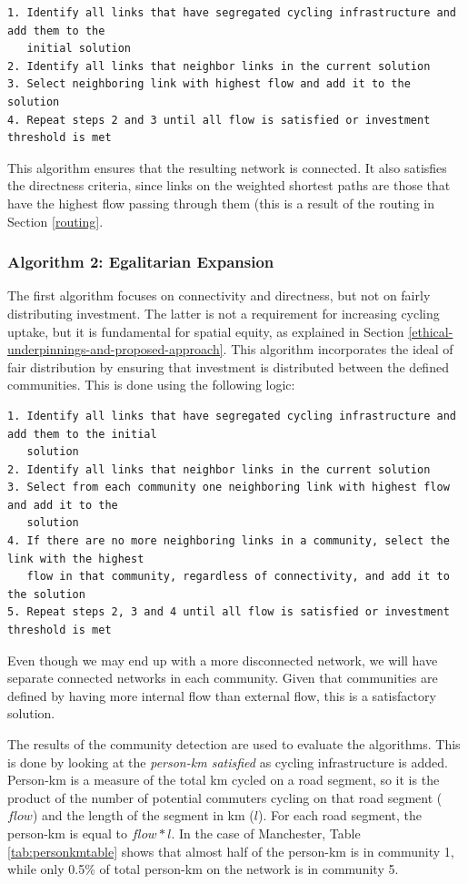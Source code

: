 \documentclass[
]{article}
\begin{document}
\begin{verbatim}
1. Identify all links that have segregated cycling infrastructure and add them to the 
   initial solution
2. Identify all links that neighbor links in the current solution
3. Select neighboring link with highest flow and add it to the solution
4. Repeat steps 2 and 3 until all flow is satisfied or investment threshold is met
\end{verbatim}

This algorithm ensures that the resulting network is connected.
It also satisfies the directness criteria, since links on the weighted shortest paths are those that have the highest flow passing through them (this is a result of the routing in Section \ref{routing}.

\hypertarget{algorithm-2-egalitarian-expansion}{%
\subsubsection{Algorithm 2: Egalitarian Expansion}\label{algorithm-2-egalitarian-expansion}}

The first algorithm focuses on connectivity and directness, but not on fairly distributing investment.
The latter is not a requirement for increasing cycling uptake, but it is fundamental for spatial equity, as explained in Section \ref{ethical-underpinnings-and-proposed-approach}.
This algorithm incorporates the ideal of fair distribution by ensuring that investment is distributed between the defined communities.
This is done using the following logic:

\begin{verbatim}
1. Identify all links that have segregated cycling infrastructure and add them to the initial
   solution
2. Identify all links that neighbor links in the current solution
3. Select from each community one neighboring link with highest flow and add it to the
   solution
4. If there are no more neighboring links in a community, select the link with the highest
   flow in that community, regardless of connectivity, and add it to the solution
5. Repeat steps 2, 3 and 4 until all flow is satisfied or investment threshold is met
\end{verbatim}

Even though we may end up with a more disconnected network, we will have separate connected networks in each community.
Given that communities are defined by having more internal flow than external flow, this is a satisfactory solution.

The results of the community detection are used to evaluate the algorithms.
This is done by looking at the \emph{person-km satisfied} as cycling infrastructure is added.
Person-km is a measure of the total km cycled on a road segment, so it is the product of the number of potential commuters cycling on that road segment (\(flow\)) and the length of the segment in km (\(l\)).
For each road segment, the person-km is equal to \(flow * l\).
In the case of Manchester, Table \ref{tab:personkmtable} shows that almost half of the person-km is in community 1, while only 0.5\% of total person-km on the network is in community 5.
\end{document}

